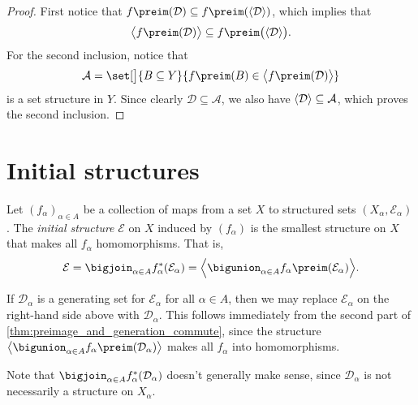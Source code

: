 \documentclass[article, a4paper, 11pt, oneside]{memoir}
\numberwithin{equation}{chapter}
\newcommand{\calE}{\mathcal{E}}
\newcommand{\calD}{\mathcal{D}}
\newcommand{\calA}{\mathcal{A}}
\DeclarePairedDelimiter{\gen}{\langle}{\rangle} %
\begin{document}
\begin{proof}
    First notice that $f\preim(\calD) \subseteq f\preim(\gen{\calD})$, which implies that
    \begin{equation*}
        \gen[\big]{f\preim(\calD)} \subseteq f\preim\bigl( \gen{\calD} \bigr).
    \end{equation*}
    For the second inclusion, notice that
    \begin{equation*}
        \calA = \set[\big]{B \subseteq Y}{f\preim(B) \in \gen[\big]{f\preim(\calD)}}
    \end{equation*}
    is a set structure in $Y$. Since clearly $\calD \subseteq \calA$, we also have $\gen{\calD} \subseteq \calA$, which proves the second inclusion.
\end{proof}


\section{Initial structures}

\begin{definition}
    Let $(f_\alpha)_{\alpha \in A}$ be a collection of maps from a set $X$ to structured sets $(X_\alpha, \calE_\alpha)$. The \emph{initial structure} $\calE$ on $X$ induced by $(f_\alpha)$ is the smallest structure on $X$ that makes all $f_\alpha$ homomorphisms. That is,
    \begin{equation*}
        \calE
            = \bigjoin_{\alpha \in A} f_\alpha^*(\calE_\alpha)
            = \gen[\Big]{ \bigunion_{\alpha \in A} f_\alpha\preim(\calE_\alpha) }.
    \end{equation*}
\end{definition}

\begin{remark}
    \label{rem:initial_structure_generating_set}
    If $\calD_\alpha$ is a generating set for $\calE_\alpha$ for all $\alpha \in A$, then we may replace $\calE_\alpha$ on the right-hand side above with $\calD_\alpha$. This follows immediately from the second part of \cref{thm:preimage_and_generation_commute}, since the structure $\gen[\big]{ \bigunion_{\alpha \in A} f_\alpha\preim(\calD_\alpha) }$ makes all $f_\alpha$ into homomorphisms.

    Note that $\bigjoin_{\alpha \in A} f_\alpha^*(\calD_\alpha)$ doesn't generally make sense, since $\calD_\alpha$ is not necessarily a structure on $X_\alpha$.
\end{remark}
\end{document}
